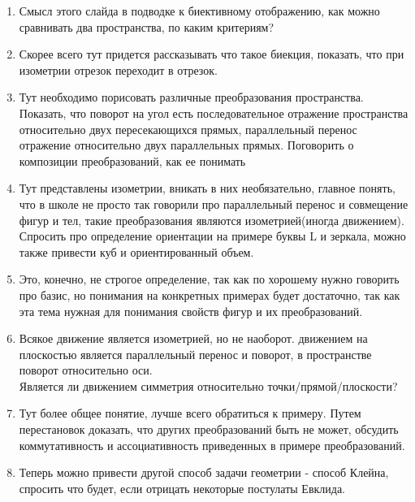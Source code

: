 \begin{enumerate}
        \item Смысл этого слайда в подводке к биективному отображению,
        как можно сравнивать два пространства, по каким критериям?

        \item Скорее всего тут придется рассказывать что такое биекция,
        показать, что при изометрии отрезок переходит в отрезок.

        \item Тут необходимо порисовать различные преобразования пространства.
        Показать, что поворот на угол есть последовательное отражение пространства относительно двух
        пересекающихся прямых, параллельный перенос отражение относительно двух параллельных прямых.
        Поговорить о композиции преобразований, как ее понимать

        \item Тут представлены изометрии, вникать в них необязательно, главное понять,
        что в школе не просто так говорили про параллельный перенос и совмещение фигур и тел,
        такие преобразования являются изометрией(иногда движением).\\

        Спросить про определение ориентации на примере буквы L и зеркала,
        можно также привести куб и ориентированный объем.

        \item Это, конечно, не строгое определение, так как по хорошему нужно говорить про базис,
        но понимания на конкретных примерах будет достаточно, так как эта тема нужная
        для понимания свойств фигур и их преобразований.

        \item Всякое движение является изометрией, но не наоборот.
        движением на плоскостью является параллельный перенос и поворот,
        в пространстве поворот относительно оси.\\
        Является ли движением симметрия относительно точки/прямой/плоскости?

        \item Тут более общее понятие, лучше всего обратиться к примеру.
        Путем перестановок доказать, что других преобразований быть не может,
        обсудить коммутативность и ассоциативность приведенных в примере преобразований.

        \item Теперь можно привести другой способ задачи геометрии - способ Клейна,
        спросить что будет, если отрицать некоторые постулаты Евклида.


\end{enumerate}
